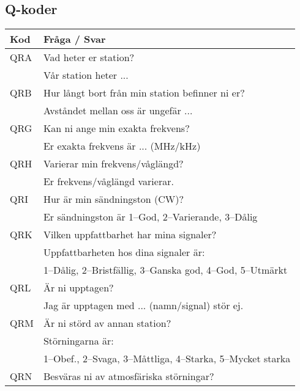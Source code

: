 \subsection{Q-koder}
\begin{longtable}{ll}
	\textbf{Kod} & \textbf{Fråga / Svar}                                                         \\ \hline \endhead
	QRA & Vad heter er station?                                                \\
	    & Vår station heter ...                                                \\ \hline
	QRB & Hur långt bort från min station befinner ni er?                      \\
	    & Avståndet mellan oss är ungefär ...                                  \\ \hline
	QRG & Kan ni ange min exakta frekvens?                                     \\
	    & Er exakta frekvens är ... (MHz/kHz)                                  \\ \hline
	QRH & Varierar min frekvens/våglängd?                                      \\
	    & Er frekvens/våglängd varierar.                                       \\ \hline
	QRI & Hur är min sändningston (CW)?                                        \\
	    & Er sändningston är 1--God, 2--Varierande, 3--Dålig                   \\ \hline
	QRK & Vilken uppfattbarhet har mina signaler?                              \\
	    & Uppfattbarheten hos dina signaler är:                                \\
	    & 1--Dålig, 2--Bristfällig, 3--Ganska god, 4--God, 5--Utmärkt          \\ \hline
	QRL & Är ni upptagen?                                                      \\
	    & Jag är upptagen med ... (namn/signal) stör ej.                       \\ \hline
	QRM & Är ni störd av annan station?                                        \\
	    & Störningarna är:                                                     \\
	    & 1--Obef., 2--Svaga, 3--Måttliga, 4--Starka, 5--Mycket starka         \\ \hline
	QRN & Besväras ni av atmosfäriska störningar?                              \\

\end{longtable}
